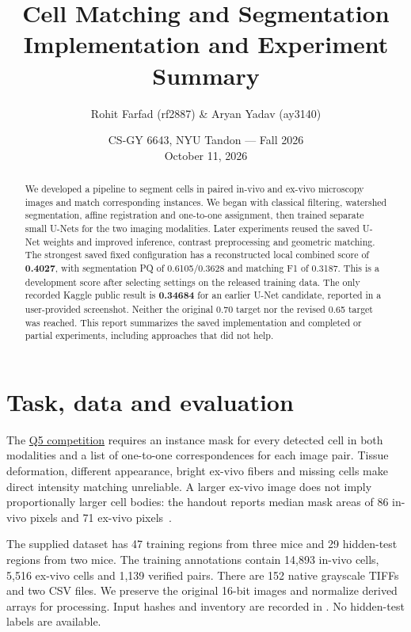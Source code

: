 \documentclass[11pt]{article}
\title{Cell Matching and Segmentation\\\large Implementation and Experiment Summary}
\author{Rohit Farfad (rf2887) \& Aryan Yadav (ay3140)}
\date{CS-GY 6643, NYU Tandon --- Fall 2026\\October 11, 2026}
\newcommand{\file}[1]{\path{#1}}
\begin{document}
\maketitle
\thispagestyle{plain}

\begin{abstract}
We developed a pipeline to segment cells in paired in-vivo and ex-vivo microscopy images and match corresponding instances. We began with classical filtering, watershed segmentation, affine registration and one-to-one assignment, then trained separate small U-Nets for the two imaging modalities. Later experiments reused the saved U-Net weights and improved inference, contrast preprocessing and geometric matching. The strongest saved fixed configuration has a reconstructed local combined score of \textbf{0.4027}, with segmentation PQ of 0.6105/0.3628 and matching F1 of 0.3187. This is a development score after selecting settings on the released training data. The only recorded Kaggle public result is \textbf{0.34684} for an earlier U-Net candidate, reported in a user-provided screenshot. Neither the original 0.70 target nor the revised 0.65 target was reached. This report summarizes the saved implementation and completed or partial experiments, including approaches that did not help.
\end{abstract}

\section{Task, data and evaluation}
The \href{https://www.kaggle.com/competitions/testingpj-2}{Q5 competition} requires an instance mask for every detected cell in both modalities and a list of one-to-one correspondences for each image pair. Tissue deformation, different appearance, bright ex-vivo fibers and missing cells make direct intensity matching unreliable. A larger ex-vivo image does not imply proportionally larger cell bodies: the handout reports median mask areas of 86 in-vivo pixels and 71 ex-vivo pixels~\cite{handout}.

The supplied dataset has 47 training regions from three mice and 29 hidden-test regions from two mice. The training annotations contain 14,893 in-vivo cells, 5,516 ex-vivo cells and 1,139 verified pairs. There are 152 native grayscale TIFFs and two CSV files. We preserve the original 16-bit images and normalize derived arrays for processing. Input hashes and inventory are recorded in \file{DATA_SOURCES.json}. No hidden-test labels are available.
\end{document}
